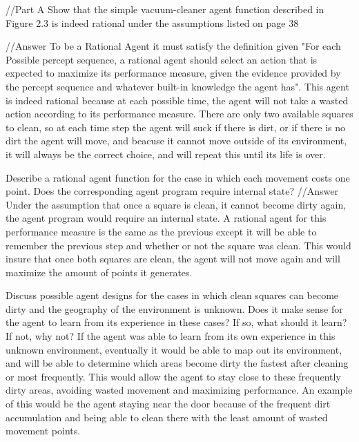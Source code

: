 //Part A
Show that the simple vacuum-cleaner agent function described in Figure 2.3 is indeed rational under the assumptions listed on page 38

//Answer
To be a Rational Agent it must satisfy the definition given "For each Possible percept sequence, a rational agent should select an action that is expected to maximize its performance measure, given the evidence provided by the percept sequence and whatever built-in knowledge the agent has".  This agent is indeed rational because at each possible time, the agent will not take a wasted action according to its performance measure.  There are only two available squares to clean, so at each time step the agent will suck if there is dirt, or if there is no dirt the agent will move, and beacuse it cannot move outside of its environment, it will always be the correct choice, and will repeat this until its life is over.


Describe a rational agent function for the case in which each movement costs one point. Does the corresponding agent program require internal state?
//Answer
Under the assumption that once a square is clean, it cannot become dirty again, the agent program would require an internal state.  A rational agent for this performance measure is the same as the previous except it will be able to remember the previous step and whether or not the square was clean.  This would insure that once both squares are clean, the agent will not move again and will maximize the amount of points it generates.


Discuss possible agent designs for the cases in which clean squares can become dirty and the geography of the environment is unknown. Does it make sense for the agent to learn from its experience in these cases? If so, what should it learn? If not, why not?
If the agent was able to learn from its own experience in this unknown environment, eventually it would be able to map out its environment, and will be able to determine which areas become dirty the fastest after cleaning or most frequently.  This would allow the agent to stay close to these frequently dirty areas, avoiding wasted movement and maximizing performance.  An example of this would be the agent staying near the door because of the frequent dirt accumulation and being able to clean there with the least amount of wasted movement points.
